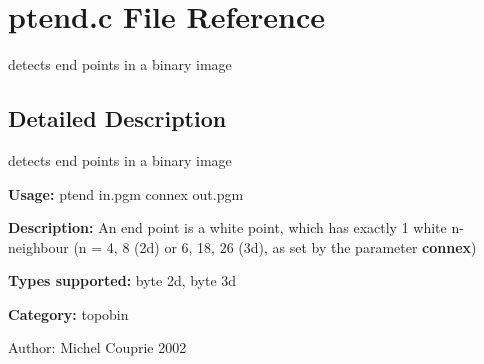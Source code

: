 \section{ptend.c File Reference}
\label{ptend_8c}
detects end points in a binary image  




\label{_details}
\subsection{Detailed Description}
detects end points in a binary image 

{\bf Usage:} ptend in.pgm connex out.pgm

{\bf Description:} An end point is a white point, which has exactly 1 white n-neighbour (n = 4, 8 (2d) or 6, 18, 26 (3d), as set by the parameter {\bf connex})

{\bf Types supported:} byte 2d, byte 3d

{\bf Category:} topobin

\begin{Desc}
\item[Author:]Michel Couprie 2002 \end{Desc}

